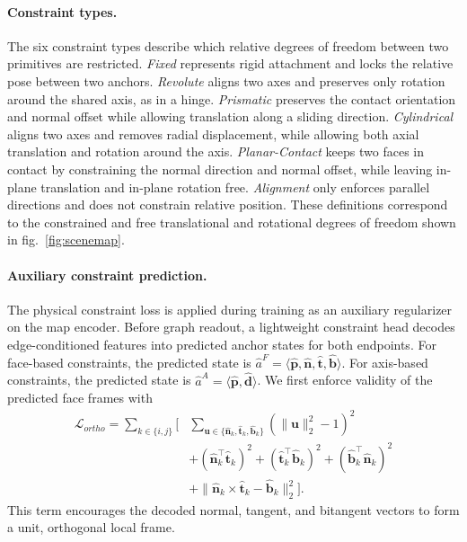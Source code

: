 \paragraph{Constraint types.}
The six constraint types describe which relative degrees of freedom between two primitives are restricted. \textit{Fixed} represents rigid attachment and locks the relative pose between two anchors. \textit{Revolute} aligns two axes and preserves only rotation around the shared axis, as in a hinge. \textit{Prismatic} preserves the contact orientation and normal offset while allowing translation along a sliding direction. \textit{Cylindrical} aligns two axes and removes radial displacement, while allowing both axial translation and rotation around the axis. \textit{Planar-Contact} keeps two faces in contact by constraining the normal direction and normal offset, while leaving in-plane translation and in-plane rotation free. \textit{Alignment} only enforces parallel directions and does not constrain relative position. These definitions correspond to the constrained and free translational and rotational degrees of freedom shown in fig.~\ref{fig:scenemap}.

\paragraph{Auxiliary constraint prediction.}
The physical constraint loss is applied during training as an auxiliary regularizer on the map encoder. Before graph readout, a lightweight constraint head decodes edge-conditioned features into predicted anchor states for both endpoints. For face-based constraints, the predicted state is $\hat{a}^{F}=\langle \hat{\mathbf{p}},\hat{\mathbf{n}},\hat{\mathbf{t}},\hat{\mathbf{b}}\rangle$. For axis-based constraints, the predicted state is $\hat{a}^{A}=\langle \hat{\mathbf{p}},\hat{\mathbf{d}}\rangle$. We first enforce validity of the predicted face frames with
\begin{equation}
\begin{aligned}
\mathcal{L}_{ortho}
= \sum_{k\in\{i,j\}} \Bigg[
&\sum_{\mathbf{u}\in\{\hat{\mathbf{n}}_k,\hat{\mathbf{t}}_k,\hat{\mathbf{b}}_k\}}
(\|\mathbf{u}\|_2^2-1)^2 \\
&+(\hat{\mathbf{n}}_k^\top\hat{\mathbf{t}}_k)^2
+(\hat{\mathbf{t}}_k^\top\hat{\mathbf{b}}_k)^2
+(\hat{\mathbf{b}}_k^\top\hat{\mathbf{n}}_k)^2 \\
&+\|\hat{\mathbf{n}}_k\times\hat{\mathbf{t}}_k-\hat{\mathbf{b}}_k\|_2^2
\Bigg].
\end{aligned}
\end{equation}
This term encourages the decoded normal, tangent, and bitangent vectors to form a unit, orthogonal local frame.

